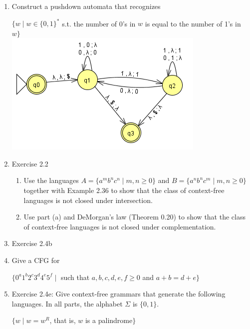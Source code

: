 \documentclass{article}
\begin{document}
\begin{enumerate}
        \item Construct a pushdown automata that recognizes 
            \begin{center}
                $\{w\mid w \in \{0,1\}^* $ s.t. the number of 0's in $ w $ is equal to the number of 1's in $ w \}$\\
                \includegraphics[scale=0.6]{machine1}                
            \end{center}
        \item Exercise 2.2
            \begin{enumerate}[label =\alph*.]
                \item Use the languages $A=\{a^mb^nc^n \mid m,n\geq 0\}$ and $B=\{a^nb^nc^m\mid m,n \geq 0\}$ together with Example 2.36 to show that 
                the class of context-free languages is not closed under intersection.
                \item Use part (a) and DeMorgan's law (Theorem 0.20) to show that the class of context-free languages is not closed under complementation.
            \end{enumerate}
        \item Exercise 2.4b

        \item Give a CFG for
            \begin{center}
                $\{0^a1^b2^c3^d4^e5^f \mid $ such that $ a,b,c,d,e,f\geq 0 $ and $ a+b=d+e \}$
            \end{center}
        
        \item Exercise 2.4e: Give context-free grammars that generate the following languages. In all parts, the alphabet $\Sigma$ is $\{0,1\}$.
            \begin{center}
                $\{w\mid w=w^R$, that is, $w$ is a palindrome$\}$
            \end{center}
                

\end{enumerate}
\end{document}
